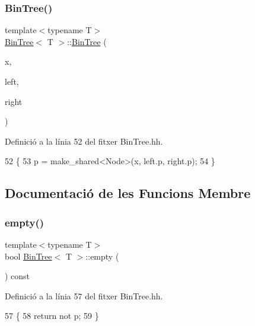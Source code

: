 \subsubsection{\texorpdfstring{Bin\+Tree()}{BinTree()}\hspace{0.1cm}{\footnotesize\ttfamily [3/3]}}
{\footnotesize\ttfamily template$<$typename T$>$ \\
\hyperlink{class_bin_tree}{Bin\+Tree}$<$ T $>$\+::\hyperlink{class_bin_tree}{Bin\+Tree} (\begin{DoxyParamCaption}\item[{const T \&}]{x,  }\item[{const \hyperlink{class_bin_tree}{Bin\+Tree}$<$ T $>$ \&}]{left,  }\item[{const \hyperlink{class_bin_tree}{Bin\+Tree}$<$ T $>$ \&}]{right }\end{DoxyParamCaption})}



Definició a la línia 52 del fitxer Bin\+Tree.\+hh.


\begin{DoxyCode}
52                                                                     \{
53         p = make\_shared<Node>(x, left.p, right.p);
54     \}
\end{DoxyCode}


\subsection{Documentació de les Funcions Membre}
\mbox{\label{class_bin_tree_a74cda259ba5c25b8ee38ed4dc33e4fad}} 
\subsubsection{\texorpdfstring{empty()}{empty()}}
{\footnotesize\ttfamily template$<$typename T$>$ \\
bool \hyperlink{class_bin_tree}{Bin\+Tree}$<$ T $>$\+::empty (\begin{DoxyParamCaption}{ }\end{DoxyParamCaption}) const}



Definició a la línia 57 del fitxer Bin\+Tree.\+hh.


\begin{DoxyCode}
57                         \{
58         \textcolor{keywordflow}{return} not p;
59     \}
\end{DoxyCode}
\mbox{\label{class_bin_tree_a82108db4c1b08d1f111027788c196d4e}} 
